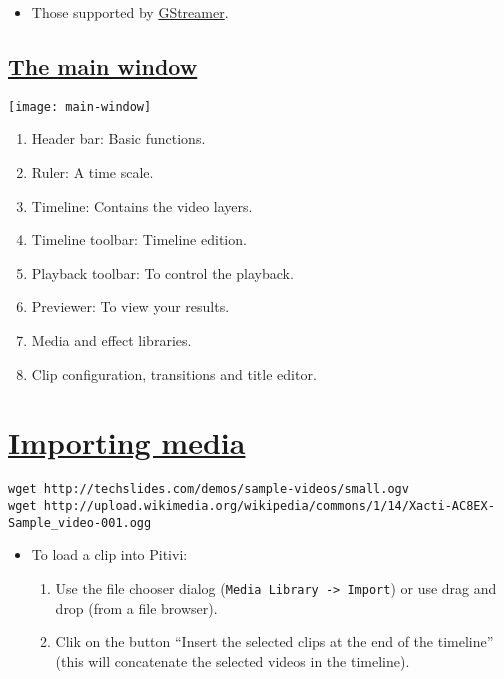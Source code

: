 \begin{itemize}
\item Those supported by
  \href{http://gstreamer.freedesktop.org/data/doc/gstreamer/head/pwg/html/section-types-definitions.html}{GStreamer}.
\end{itemize}


\section{\href{http://www.pitivi.org/manual/mainwindow.html}{The main window}}

\begin{center}
\texttt{[image: main-window]}
\end{center}

\begin{enumerate}
\item Header bar: Basic functions.
\item Ruler: A time scale.
\item Timeline: Contains the video layers.
\item Timeline toolbar: Timeline edition.
\item Playback toolbar: To control the playback.
\item Previewer: To view your results.
\item Media and effect libraries.
\item Clip configuration, transitions and title editor.
\end{enumerate}




\chapter{\href{http://www.pitivi.org/manual/importing.html}{Importing media}}

\begin{verbatim}
wget http://techslides.com/demos/sample-videos/small.ogv
wget http://upload.wikimedia.org/wikipedia/commons/1/14/Xacti-AC8EX-Sample_video-001.ogg
\end{verbatim}

\begin{itemize}
\item To load a clip into Pitivi:
\begin{enumerate}
\item Use the file chooser dialog (\verb|Media Library -> Import|) or use drag and drop (from a file browser).
\item Clik on the button ``Insert the selected clips at the end of the timeline'' (this will concatenate the selected videos in the timeline).
\end{enumerate}
\end{itemize}

